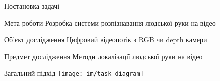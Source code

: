 \begin{frame}{Постановка задачі}
	\manimate
	\begin{block}{Мета роботи}
		Розробка системи розпізнавання людської руки на відео
	\end{block} 

	\begin{block}{Об'єкт дослідження}
		Цифровий відеопотік з RGB чи depth камери
	\end{block}
	
	\begin{block}{Предмет дослідження}
		Методи локалізації людської руки на відео
	\end{block}
\end{frame}

\begin{frame}{Загальний підхід}
	\manimate
	\centering
	\texttt{[image: im/task\_diagram]}
\end{frame}